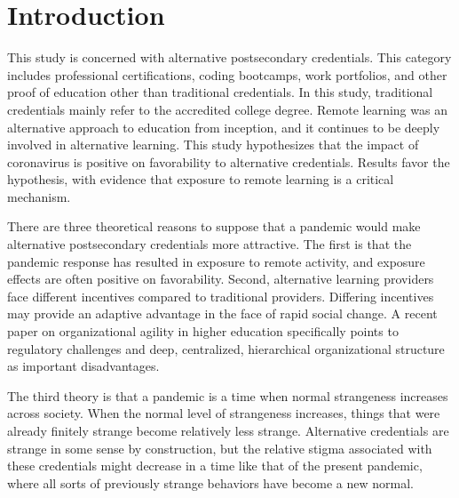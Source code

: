 \documentclass[review]{elsarticle}
\begin{document}
\pagebreak
\linenumbers

\section{Introduction}

This study is concerned with alternative postsecondary credentials.
This category includes professional certifications, coding bootcamps, work portfolios,
and other proof of education other than traditional credentials.
In this study, traditional credentials mainly refer to the accredited college degree.
Remote learning was an alternative approach to education from inception, and it continues to be deeply involved in alternative learning.
This study hypothesizes that the impact of coronavirus is positive on favorability to alternative credentials.
Results favor the hypothesis, with evidence that exposure to remote learning is a critical mechanism.

There are three theoretical reasons to suppose that a pandemic would make alternative postsecondary credentials more attractive.
The first is that the pandemic response has resulted in exposure to remote activity, and exposure effects are often positive on favorability.
Second, alternative learning providers face different incentives compared to traditional providers. Differing incentives may provide an adaptive advantage in the face of rapid social change.
A recent paper on organizational agility in higher education specifically points to regulatory challenges and deep, centralized, hierarchical organizational structure as important disadvantages\cite{menon2020factors}.

The third theory is that a pandemic is a time when normal strangeness increases across society.
When the normal level of strangeness increases, things that were already finitely strange become relatively less strange.
Alternative credentials are strange in some sense by construction,
but the relative stigma associated with these credentials might decrease in a time like that of the present pandemic,
where all sorts of previously strange behaviors have become a new normal.
\end{document}
